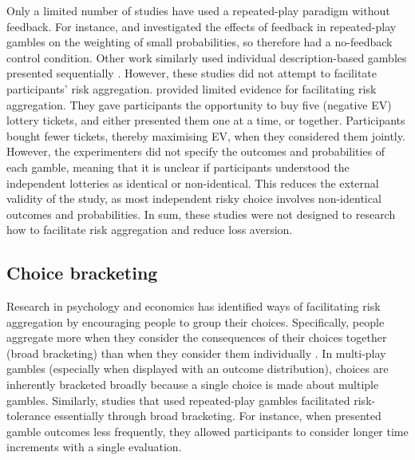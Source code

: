 \documentclass[a4paper, nobind, dvipsnames]{templates/ociamthesis}
\theoremstyle{definition}
\theoremstyle{definition}
\theoremstyle{definition}
\theoremstyle{definition}
\theoremstyle{remark}
\begin{document}
Only a limited number of studies have used a repeated-play paradigm without
feedback. For instance, \textcite{jessup2008} and \textcite{hertwig2004} investigated the effects of
feedback in repeated-play gambles on the weighting of small probabilities, so
therefore had a no-feedback control condition. Other work similarly used
individual description-based gambles presented sequentially \autocites[e.g.,][]{ert2013,joag1990}. However, these studies did not attempt to facilitate participants'
risk aggregation. \textcite{haisley2008} provided limited evidence for facilitating risk
aggregation. They gave participants the opportunity to buy five (negative EV)
lottery tickets, and either presented them one at a time, or together.
Participants bought fewer tickets, thereby maximising EV, when they considered
them jointly. However, the experimenters did not specify the outcomes and
probabilities of each gamble, meaning that it is unclear if participants
understood the independent lotteries as identical or non-identical. This reduces
the external validity of the study, as most independent risky choice involves
non-identical outcomes and probabilities. In sum, these studies were not
designed to research how to facilitate risk aggregation and reduce loss
aversion.

\hypertarget{choice-bracketing}{%
\subsection{Choice bracketing}\label{choice-bracketing}}

Research in psychology and economics has identified ways of facilitating risk
aggregation by encouraging people to group their choices. Specifically, people
aggregate more when they consider the consequences of their choices together
(broad bracketing) than when they consider them individually \autocite[narrow bracketing;][]{read1999}. In multi-play gambles (especially when displayed with an outcome
distribution), choices are inherently bracketed broadly because a single choice
is made about multiple gambles. Similarly, studies that used repeated-play
gambles facilitated risk-tolerance essentially through broad bracketing. For
instance, when \textcite{thaler1997} presented gamble outcomes less frequently, they
allowed participants to consider longer time increments with a single
evaluation.
\end{document}
